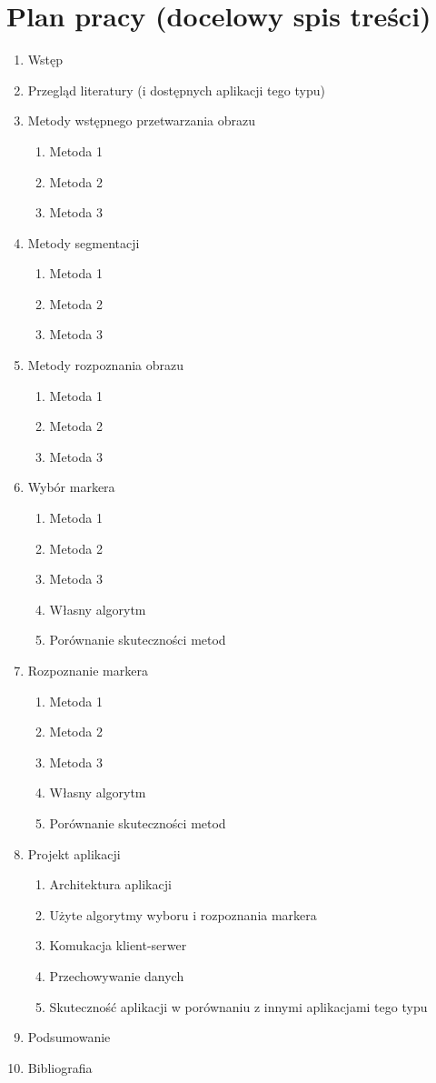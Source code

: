 \chapter{Plan pracy (docelowy spis treści)}

\begin{enumerate}
 \item Wstęp
 \item Przegląd literatury (i dostępnych aplikacji tego typu)
 \item Metody wstępnego przetwarzania obrazu
  \begin{enumerate}
   \item Metoda 1
   \item Metoda 2
   \item Metoda 3
  \end{enumerate}
 \item Metody segmentacji
  \begin{enumerate}
   \item Metoda 1
   \item Metoda 2
   \item Metoda 3
  \end{enumerate}
 \item Metody rozpoznania obrazu
  \begin{enumerate}
   \item Metoda 1
   \item Metoda 2
   \item Metoda 3
  \end{enumerate}
 \item Wybór markera
  \begin{enumerate}
   \item Metoda 1
   \item Metoda 2
   \item Metoda 3
   \item Własny algorytm
   \item Porównanie skuteczności metod
  \end{enumerate}
 \item Rozpoznanie markera
  \begin{enumerate}
   \item Metoda 1
   \item Metoda 2
   \item Metoda 3
   \item Własny algorytm
   \item Porównanie skuteczności metod
  \end{enumerate}
 \item Projekt aplikacji
  \begin{enumerate}
   \item Architektura aplikacji
   \item Użyte algorytmy wyboru i rozpoznania markera
   \item Komukacja klient-serwer
   \item Przechowywanie danych
   \item Skuteczność aplikacji w porównaniu z innymi aplikacjami tego typu
  \end{enumerate}
 \item Podsumowanie
 \item Bibliografia
\end{enumerate}
